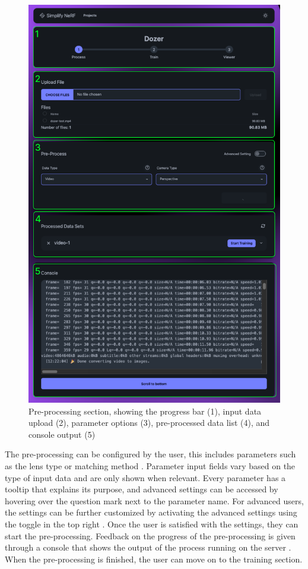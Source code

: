 \begin{figure}[h!]
  \centering
  \includegraphics[width=.7\textwidth]{figures/view-process.png}
  \caption{Pre-processing section, showing the progress bar (1), input data upload (2), parameter options (3), pre-processed data list (4), and console output (5)}
  \label{fig:design:input-section}
\end{figure}

The pre-processing can be configured by the user, this includes parameters such as the lens type or matching method .
Parameter input fields vary based on the type of input data and are only shown when relevant.
Every parameter has a tooltip that explains its purpose, and advanced settings can be accessed by hovering over the question mark next to the parameter name.
For advanced users, the settings can be further customized by activating the advanced settings using the toggle in the top right .
Once the user is satisfied with the settings, they can start the pre-processing.
Feedback on the progress of the pre-processing is given through a console that shows the output of the process running on the server .
When the pre-processing is finished, the user can move on to the training section.

